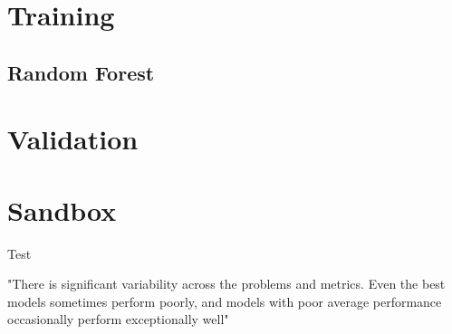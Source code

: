 \documentclass[11pt,a4paper,oldtoc,final]{tufte-book}
\begin{document}


\chapter{Training}

\section{Random Forest}

\cite{Breiman2001}

\chapter{Validation}

\chapter{Sandbox}

Test \cite{Tufte2006}


"There is significant variability across the problems
and metrics. Even the best models sometimes perform
poorly, and models with poor average performance occasionally
perform exceptionally well" \cite{Caruana2006}




%


%

\backmatter




\printindex
\end{document}
